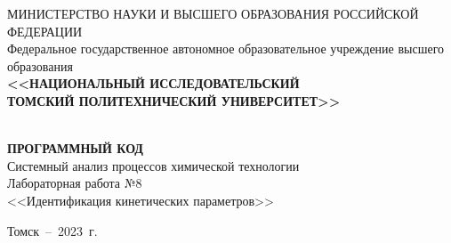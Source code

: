 \begin{titlepage}
	\begin{center}
\sffamily	\small{\MakeUppercase {Министерство науки и высшего образования
			Российской Федерации}}\\
		\footnotesize {Федеральное государственное автономное образовательное учреждение  высшего образования}\\
	\small	\MakeTextUppercase{\textbf{<<Национальный исследовательский} \\ \textbf{Томский политехнический университет>>}} \\
		\hrulefill
		\\[4cm]


		\bigskip

		{
			\Large \MakeUppercase{\textbf{Программный код}} \\

			Системный анализ процессов химической технологии \\
			Лабораторная работа №8 \\
			<<Идентификация кинетических параметров>>
			\
			 \bigskip



		}

\vspace{0.1\textheight}
\begin{minipage}{0.46\linewidth}
	\hfil
\end{minipage}



		\vfill
		Томск~--~2023~г.
	\end{center}

\end{titlepage}